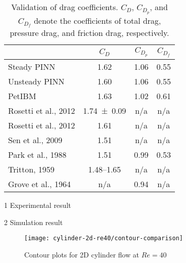 \begin{table}[h]
    \centering%
    \begin{threeparttable}
        \begin{tabular}{lccc}
            \toprule
            & $C_D$ & $C_{D_p}$ & $C_{D_f}$ \\
            \midrule
            Steady PINN & 1.62 & 1.06 & 0.55 \\
            Unsteady PINN & 1.60 & 1.06 & 0.55 \\
            PetIBM & 1.63 & 1.02 & 0.61 \\
            Rosetti et al., 2012\cite{rosetti_urans_2012}\tnote{1} & \num{1.74+-0.09} & n/a & n/a \\
            Rosetti et al., 2012\cite{rosetti_urans_2012}\tnote{2} & 1.61 & n/a & n/a \\
            Sen et al., 2009\cite{sen_steady_2009}\tnote{2} & 1.51 & n/a & n/a \\
            Park et al., 1988\cite{park_numerical_1998}\tnote{2} & 1.51 & 0.99 & 0.53 \\
            Tritton, 1959\cite{tritton_experiments_1959}\tnote{1} & 1.48--1.65 & n/a & n/a \\
            Grove et al., 1964\cite{grove_experimental_1964}\tnote{1} & n/a & 0.94 & n/a \\
            \bottomrule
        \end{tabular}%
        \begin{tablenotes}
            \footnotesize
            \item [1] Experimental result
            \item [2] Simulation result
        \end{tablenotes}
        \caption{%
            Validation of drag coefficients. %
            $C_D$, $C_{D_p}$, and $C_{D_f}$ denote the coefficients of total drag, pressure drag, %
            and friction drag, respectively.%
        }%
        \label{table:cylinder-re40-cd-comparison}
    \end{threeparttable}
\end{table}%


\begin{figure*}
    \centering%
    \texttt{[image: cylinder-2d-re40/contour-comparison]}%
    \caption{%
        Contour plots for 2D cylinder flow at $Re=\num{40}$
    }
    \label{fig:cylinder-re40-contours}%
\end{figure*}

